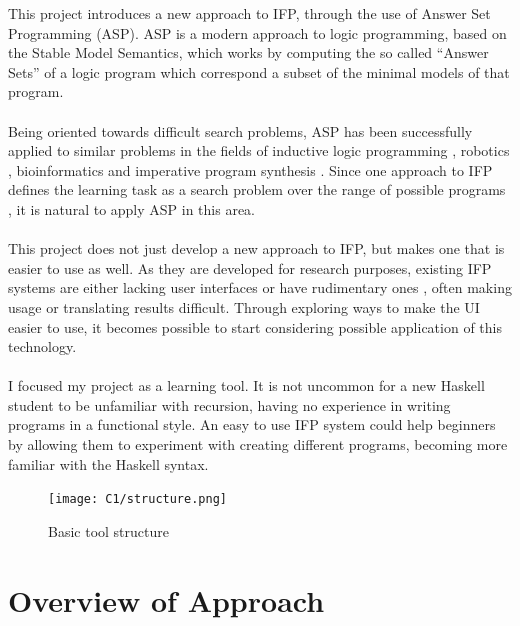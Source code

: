 This project introduces a new approach to IFP, through the use of Answer Set Programming (ASP). ASP \cite{Lifschitz1999} is a modern approach to logic programming, based on the Stable Model Semantics, which works by computing the so called ``Answer Sets'' of a logic program which correspond a subset of the minimal models of that program. \\ \\
Being oriented towards difficult search problems, ASP has been successfully applied to similar problems in the fields of inductive logic programming \cite{Corapi2012}, robotics \cite{Yang}, bioinformatics \cite{Guziolowski2013} and imperative program synthesis \cite{Crowe2015}. Since one approach to IFP defines the learning task as a search problem over the range of possible programs \cite{Katayama2012}, it is natural to apply ASP in this area. \\ \\
This project does not just develop a new approach to IFP, but makes one that is easier to use as well. As they are developed for research purposes, existing IFP systems are either lacking user interfaces \cite{igordemo} or have rudimentary ones \cite{Katayama2013}, often making usage or translating results difficult. Through exploring ways to make the UI easier to use, it becomes possible to start considering possible application of this technology. \\ \\
I focused my project as a learning tool. It is not uncommon for a new Haskell student to be unfamiliar with recursion, having no experience in writing programs in a functional style. An easy to use IFP system could help beginners by allowing them to experiment with creating different programs, becoming more familiar with the Haskell syntax.

\begin{figure}[h!]
\centering
\texttt{[image: C1/structure.png]}
\caption{Basic tool structure}
\label{fig:structure}
\end{figure}

\section{Overview of Approach}

